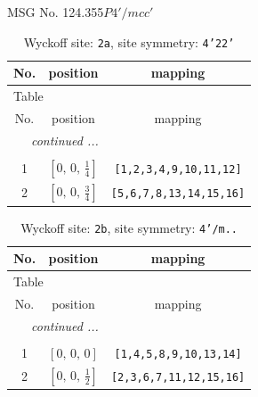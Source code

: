 \documentclass[fleqn,8pt]{jsarticle}
\begin{document}
\setcounter{MaxMatrixCols}{32}

\renewcommand{\tablename}{Table~}
\renewcommand{\figurename}{Figure~}
\begin{center}
\LARGE
MSG No. 124.355\quad$P4'/mcc'$
\end{center}
\renewcommand{\arraystretch}{1.2}
\begin{longtable}{ccc}
\caption{Wyckoff site: {\tt 2a}, site symmetry: {\tt 4'22'}}
 \\
 \hline \hline
No. & position & mapping \\ \hline \endfirsthead

\multicolumn{2}{l}{\tablename\ \thetable{}} \\
 \hline \hline
No. & position & mapping \\ \hline \endhead

 \hline \hline
\multicolumn{2}{r}{\footnotesize\it continued ...} \\ \endfoot

 \hline \hline
\multicolumn{2}{r}{} \\ \endlastfoot

1 & $\left[ 0,\, 0,\, \frac{1}{4} \right]$ & {\tt [1,2,3,4,9,10,11,12]} \\ \hline
2 & $\left[ 0,\, 0,\, \frac{3}{4} \right]$ & {\tt [5,6,7,8,13,14,15,16]} \\
\end{longtable}
\renewcommand{\arraystretch}{1.2}
\begin{longtable}{ccc}
\caption{Wyckoff site: {\tt 2b}, site symmetry: {\tt 4'/m..}}
 \\
 \hline \hline
No. & position & mapping \\ \hline \endfirsthead

\multicolumn{2}{l}{\tablename\ \thetable{}} \\
 \hline \hline
No. & position & mapping \\ \hline \endhead

 \hline \hline
\multicolumn{2}{r}{\footnotesize\it continued ...} \\ \endfoot

 \hline \hline
\multicolumn{2}{r}{} \\ \endlastfoot

1 & $\left[ 0,\, 0,\, 0 \right]$ & {\tt [1,4,5,8,9,10,13,14]} \\ \hline
2 & $\left[ 0,\, 0,\, \frac{1}{2} \right]$ & {\tt [2,3,6,7,11,12,15,16]} \\
\end{longtable}
\end{document}
